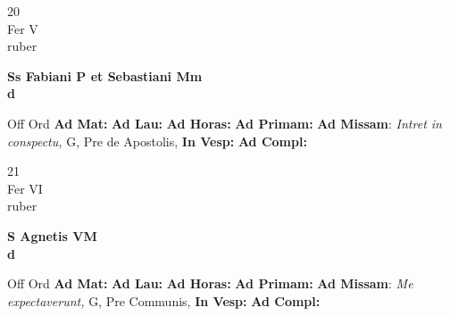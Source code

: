 \documentclass[10pt, openany]{book}
\begin{document}
        \begin{center}
            \begin{minipage}{3.5in}
                \vspace{2em}
                \begin{minipage}{0.5in}
                    {\Huge 20} \\
                    {\normalsize Fer V} \\
                    {\normalsize ruber}
                \end{minipage}
                \begin{minipage}{3.0in}
                    \textbf{ \large Ss Fabiani P et Sebastiani Mm \\
                    \textnormal{\normalsize d}} \\ 
                \end{minipage}
                \begin{justify}Off Ord
                    \textbf{Ad Mat: }
                    \textbf{Ad Lau: }
                    \textbf{Ad Horas: }
                    \textbf{Ad Primam: }\textbf{Ad Missam}: \textit{Intret in conspectu,} G, Pre de Apostolis,  
                    \textbf{In Vesp: }
                    \textbf{Ad Compl: }
                \end{justify}
            \end{minipage}
        \end{center}
    
        \begin{center}
            \begin{minipage}{3.5in}
                \vspace{2em}
                \begin{minipage}{0.5in}
                    {\Huge 21} \\
                    {\normalsize Fer VI} \\
                    {\normalsize ruber}
                \end{minipage}
                \begin{minipage}{3.0in}
                    \textbf{ \large S Agnetis VM \\
                    \textnormal{\normalsize d}} \\ 
                \end{minipage}
                \begin{justify}Off Ord
                    \textbf{Ad Mat: }
                    \textbf{Ad Lau: }
                    \textbf{Ad Horas: }
                    \textbf{Ad Primam: }\textbf{Ad Missam}: \textit{Me expectaverunt,} G, Pre Communis,  
                    \textbf{In Vesp: }
                    \textbf{Ad Compl: }
                \end{justify}
            \end{minipage}
        \end{center}
    
\end{document}
